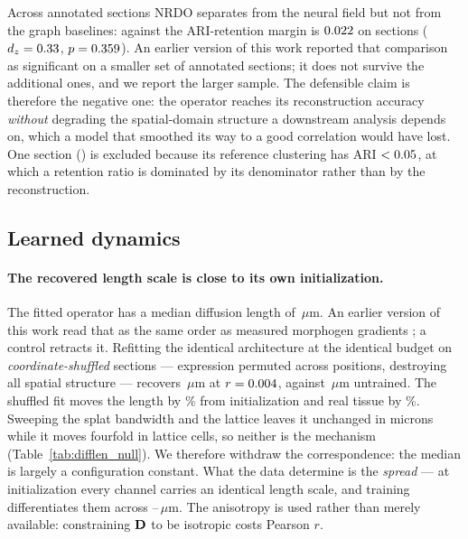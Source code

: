 Across \BioSections{} annotated sections NRDO separates from the neural field
but not from the graph baselines: against \MSBestBaseline{} the ARI-retention
margin is $0.022$ on \BioARIStagateWins{} sections
($d_z = 0.33$, $p = 0.359$). An earlier version of this
work reported that comparison as significant on a smaller set of annotated
sections; it does not survive the additional ones, and we report the larger
sample. The defensible claim is therefore the negative one: the operator reaches
its reconstruction accuracy \emph{without} degrading the spatial-domain
structure a downstream analysis depends on, which a model that smoothed its way
to a good correlation would have lost. One section (\BioExcluded) is excluded
because its reference clustering has ARI $<0.05$, at which a retention
ratio is dominated by its denominator rather than by the reconstruction.

\subsection{Learned dynamics}


\paragraph{The recovered length scale is close to its own initialization.}
The fitted operator has a median diffusion length of \NullBaseline\,$\mu$m. An
earlier version of this work read that as the same order as measured morphogen
gradients \citep{kicheva2007kinetics,yu2009fgf8}; a control retracts it. Refitting
the identical architecture at the identical budget on \emph{coordinate-shuffled}
sections --- expression permuted across positions, destroying all spatial
structure --- recovers \NullShuffled\,$\mu$m at $r = 0.004$, against
\NullInit\,$\mu$m untrained. The shuffled fit moves the length by
\NullShuffledShift\% from initialization and real tissue by \NullDataShift\%.
Sweeping the splat bandwidth and the lattice leaves it unchanged in microns while
it moves fourfold in lattice cells, so neither is the mechanism
(Table~\ref{tab:difflen_null}). We therefore withdraw the correspondence: the
median is largely a configuration constant. What the data determine is the
\emph{spread} --- at initialization every channel carries an identical length
scale, and training differentiates them across \DiffLenLo--\DiffLenHi\,$\mu$m. The anisotropy is
used rather than merely available: constraining $\mathbf{D}$ to be isotropic costs
\AblIsotropicDelta{} Pearson $r$.

